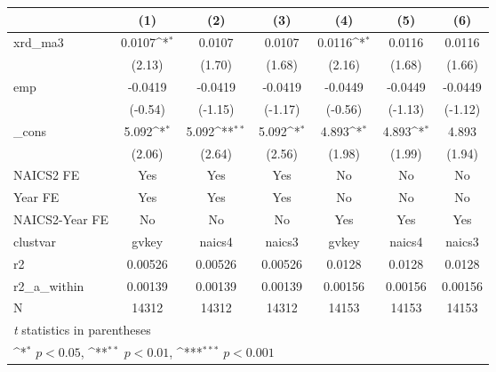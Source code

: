 {
\def\sym#1{\ifmmode^{#1}\else\(^{#1}\)\fi}
\begin{tabular}{l*{6}{c}}
\hline\hline
            &\multicolumn{1}{c}{(1)}         &\multicolumn{1}{c}{(2)}         &\multicolumn{1}{c}{(3)}         &\multicolumn{1}{c}{(4)}         &\multicolumn{1}{c}{(5)}         &\multicolumn{1}{c}{(6)}         \\
\hline
xrd\_ma3     &      0.0107\sym{*}  &      0.0107         &      0.0107         &      0.0116\sym{*}  &      0.0116         &      0.0116         \\
            &      (2.13)         &      (1.70)         &      (1.68)         &      (2.16)         &      (1.68)         &      (1.66)         \\
[1em]
emp         &     -0.0419         &     -0.0419         &     -0.0419         &     -0.0449         &     -0.0449         &     -0.0449         \\
            &     (-0.54)         &     (-1.15)         &     (-1.17)         &     (-0.56)         &     (-1.13)         &     (-1.12)         \\
[1em]
\_cons      &       5.092\sym{*}  &       5.092\sym{**} &       5.092\sym{*}  &       4.893\sym{*}  &       4.893\sym{*}  &       4.893         \\
            &      (2.06)         &      (2.64)         &      (2.56)         &      (1.98)         &      (1.99)         &      (1.94)         \\
[1em]
NAICS2 FE   &         Yes         &         Yes         &         Yes         &          No         &          No         &          No         \\
[1em]
Year FE     &         Yes         &         Yes         &         Yes         &          No         &          No         &          No         \\
[1em]
NAICS2-Year FE&          No         &          No         &          No         &         Yes         &         Yes         &         Yes         \\
\hline
clustvar    &       gvkey         &      naics4         &      naics3         &       gvkey         &      naics4         &      naics3         \\
r2          &     0.00526         &     0.00526         &     0.00526         &      0.0128         &      0.0128         &      0.0128         \\
r2\_a\_within &     0.00139         &     0.00139         &     0.00139         &     0.00156         &     0.00156         &     0.00156         \\
N           &       14312         &       14312         &       14312         &       14153         &       14153         &       14153         \\
\hline\hline
\multicolumn{7}{l}{\footnotesize \textit{t} statistics in parentheses}\\
\multicolumn{7}{l}{\footnotesize \sym{*} \(p<0.05\), \sym{**} \(p<0.01\), \sym{***} \(p<0.001\)}\\
\end{tabular}
}
